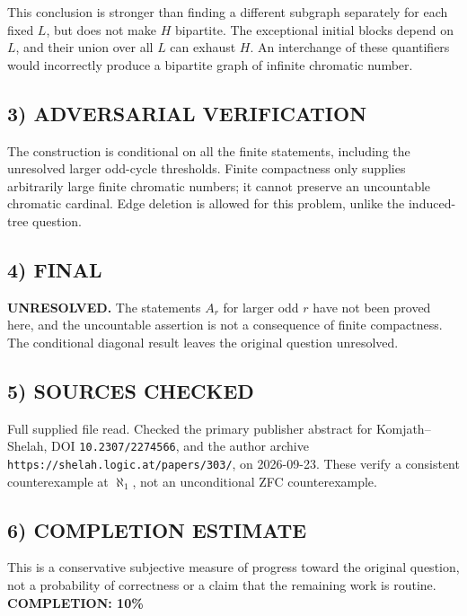 This conclusion is stronger than finding a different subgraph separately for each fixed $L$, but does not make $H$ bipartite. The exceptional initial blocks depend on $L$, and their union over all $L$ can exhaust $H$. An interchange of these quantifiers would incorrectly produce a bipartite graph of infinite chromatic number.
\subsection{3) ADVERSARIAL VERIFICATION}
The construction is conditional on all the finite statements, including the unresolved larger odd-cycle thresholds. Finite compactness only supplies arbitrarily large finite chromatic numbers; it cannot preserve an uncountable chromatic cardinal. Edge deletion is allowed for this problem, unlike the induced-tree question.
\subsection{4) FINAL}
\textbf{UNRESOLVED.}
The statements $A_r$ for larger odd $r$ have not been proved here, and the uncountable assertion is not a consequence of finite compactness. The conditional diagonal result leaves the original question unresolved.
\subsection{5) SOURCES CHECKED}
Full supplied file read. Checked the primary publisher abstract for Komj\textquotesingle ath--Shelah, DOI \texttt{10.2307/2274566}, and the author archive \texttt{https://shelah.logic.at/papers/303/}, on 2026-09-23. These verify a consistent counterexample at $\aleph_1$, not an unconditional ZFC counterexample.
\subsection{6) COMPLETION ESTIMATE}
This is a conservative subjective measure of progress toward the original question, not a probability of correctness or a claim that the remaining work is routine.
\textbf{COMPLETION: 10\%}

